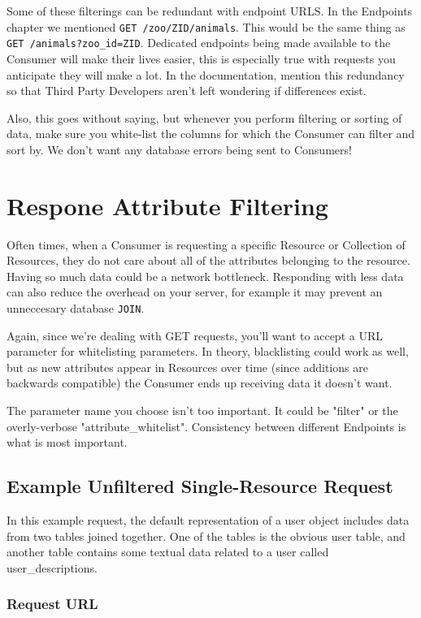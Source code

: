 \documentclass{book}
\begin{document}
Some of these filterings can be redundant with endpoint URLS. In the Endpoints chapter we mentioned \texttt{GET /zoo/ZID/animals}. This would be the same thing as \texttt{GET /animals?zoo\_id=ZID}. Dedicated endpoints being made available to the Consumer will make their lives easier, this is especially true with requests you anticipate they will make a lot. In the documentation, mention this redundancy so that Third Party Developers aren't left wondering if differences exist.

Also, this goes without saying, but whenever you perform filtering or sorting of data, make sure you white-list the columns for which the Consumer can filter and sort by. We don't want any database errors being sent to Consumers!


\chapter{Respone Attribute Filtering}

Often times, when a Consumer is requesting a specific Resource or Collection of Resources, they do not care about all of the attributes belonging to the resource. Having so much data could be a network bottleneck. Responding with less data can also reduce the overhead on your server, for example it may prevent an unneccesary database \texttt{JOIN}.

Again, since we're dealing with GET requests, you'll want to accept a URL parameter for whitelisting parameters. In theory, blacklisting could work as well, but as new attributes appear in Resources over time (since additions are backwards compatible) the Consumer ends up receiving data it doesn't want.

The parameter name you choose isn't too important. It could be "filter" or the overly-verbose "attribute\_whitelist". Consistency between different Endpoints is what is most important.

\section{Example Unfiltered Single-Resource Request}

In this example request, the default representation of a user object includes data from two tables joined together. One of the tables is the obvious user table, and another table contains some textual data related to a user called user\_descriptions.

\subsection{Request URL}
\end{document}

